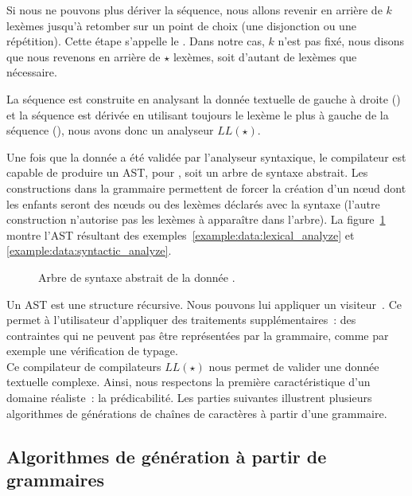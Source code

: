 Si nous ne pouvons plus dériver la séquence, nous allons revenir en arrière de
$k$ lexèmes jusqu'à retomber sur un point de choix (une disjonction ou une
répétition). Cette étape s'appelle le . Dans notre cas,
$k$ n'est pas fixé, nous disons que nous revenons en arrière de $\star$ lexèmes,
soit d'autant de lexèmes que nécessaire.

La séquence est construite en analysant la donnée textuelle de gauche à droite
() et la séquence est dérivée en utilisant
toujours le lexème le plus à gauche de la séquence (), nous avons donc un analyseur $LL(\star)$.

Une fois que la donnée a été validée par l'analyseur syntaxique, le compilateur
est capable de produire un AST, pour , soit un
arbre de syntaxe abstrait. Les constructions  dans la grammaire
permettent de forcer la création d'un nœud dont les enfants seront des nœuds ou
des lexèmes déclarés avec la syntaxe  (l'autre construction
 n'autorise pas les lexèmes à apparaître dans l'arbre). La
figure~\ref{figure:data:ast} montre l'AST résultant des
exemples~\ref{example:data:lexical_analyze} et
\ref{example:data:syntactic_analyze}.
%
\begin{figure}


\caption[Arbre de syntaxe abstrait.]{\label{figure:data:ast} Arbre de syntaxe
abstrait de la donnée .}

\end{figure}
%
Un AST est une structure récursive. Nous pouvons lui appliquer un {\strong
visiteur}~. Ce  permet à
l'utilisateur d'appliquer des traitements supplémentaires~: des contraintes qui
ne peuvent pas être représentées par la grammaire, comme par exemple une
vérification de typage. \\

Ce compilateur de compilateurs $LL(\star)$ nous permet de valider une donnée
textuelle complexe. Ainsi, nous respectons la première caractéristique d'un
domaine réaliste~: la prédicabilité. Les parties suivantes illustrent plusieurs
algorithmes de générations de chaînes de caractères à partir d'une grammaire.

\subsection{Algorithmes de génération à partir de grammaires}
\label{subsection:data:algorithms}


